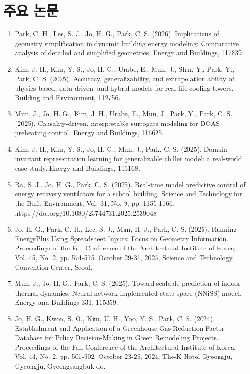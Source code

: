 \documentclass[10pt,a4paper]{article}
\begin{document}
\section*{주요 논문}
\begin{enumerate}[leftmargin=*]
\item Park, C. H., Lee, S. J., Jo, H. G., Park, C. S. (2026). Implications of geometry simplification in dynamic building energy modeling: Comparative analysis of detailed and simplified geometries. Energy and Buildings, 117839.
\item Kim, J. H., Kim, Y. S., Jo, H. G., Urabe, E., Mun, J., Shin, Y., Park, Y., Park, C. S. (2025). Accuracy, generalizability, and extrapolation ability of physics-based, data-driven, and hybrid models for real-life cooling towers. Building and Environment, 112756.
\item Mun, J., Jo, H. G., Kim, J. H., Urabe, E., Mun, J., Park, Y., Park, C. S. (2025). Causality-driven, interpretable surrogate modeling for DOAS preheating control. Energy and Buildings, 116625.
\item Kim, J. H., Kim, Y. S., Jo, H. G., Mun, J., Park, C. S. (2025). Domain-invariant representation learning for generalizable chiller model: a real-world case study. Energy and Buildings, 116168.
\item Ra, S. J., Jo, H. G., Park, C. S. (2025). Real-time model predictive control of energy recovery ventilators for a school building. Science and Technology for the Built Environment, Vol. 31, No. 9, pp. 1155-1166. https://doi.org/10.1080/23744731.2025.2539048
\item Jo, H. G., Park, C. H., Lee, S. J., Mun, H. J., Park, C. S. (2025). Running EnergyPlus Using Spreadsheet Inputs: Focus on Geometry Information. Proceedings of the Fall Conference of the Architectural Institute of Korea, Vol. 45, No. 2, pp. 574-575. October 29-31, 2025, Science and Technology Convention Center, Seoul.
\item Mun, J., Jo, H. G., Park, C. S. (2025). Toward scalable prediction of indoor thermal dynamics: Neural-network-implemented state-space (NNiSS) model. Energy and Buildings 331, 115359.
\item Jo, H. G., Kwon, S. O., Kim, U. H., Yoo, Y. S., Park, C. S. (2024). Establishment and Application of a Greenhouse Gas Reduction Factor Database for Policy Decision-Making in Green Remodeling Projects. Proceedings of the Fall Conference of the Architectural Institute of Korea, Vol. 44, No. 2, pp. 501-502. October 23-25, 2024, The-K Hotel Gyeongju, Gyeongju, Gyeongsangbuk-do.

\end{enumerate}
\end{document}
